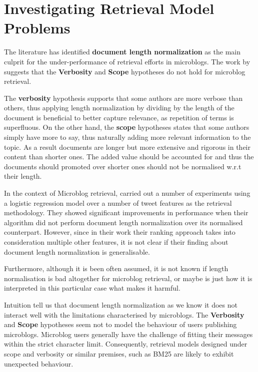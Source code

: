 \section{Investigating Retrieval Model Problems}
\label{RMinvestigation}
The literature has identified \textbf{document length normalization} as the main culprit for the under-performance of retrieval efforts in microblogs. The work by \cite{naveed2011searching} suggests that the \textbf{Verbosity} and \textbf{Scope} hypotheses do not hold for microblog retrieval.

The \textbf{verbosity} hypothesis supports that some authors are more verbose than others, thus applying length normalization by dividing by the length of the document is beneficial to better capture relevance, as repetition of terms is superfluous. On the other hand, the \textbf{scope} hypotheses states that some authors simply have more to say, thus naturally adding more relevant information to the topic. As a result documents are longer but more extensive and rigorous in their content than shorter ones. The added value should be accounted for and thus the documents should promoted over shorter ones should not be normalised w.r.t their length.

In the context of Microblog retrieval, \cite{naveed2011searching} carried out a number of experiments using a logistic regression model over a number of tweet features as the retrieval methodology. They showed significant improvements in performance when their algorithm did not perform document length normalization over its normalised counterpart. However, since in their work their ranking approach takes into consideration multiple other features, it is not clear if their finding about document length normalization is generalisable.

Furthermore, although it is been often assumed, it is not known if length normalisation is bad altogether for microblog retrieval, or maybe is just how it is interpreted in this particular case what makes it harmful.

Intuition tell us that document length normalization as we know it does not interact well with the limitations characterised by microblogs. The \textbf{Verbosity} and \textbf{Scope} hypotheses seem not to model the behaviour of users publishing microblogs. Microblog users generally have the challenge of fitting their messages within the strict character limit. Consequently, retrieval models designed under scope and verbosity or similar premises, such as BM25 \cite{robertson2009probabilistic} are likely to exhibit unexpected behaviour.

